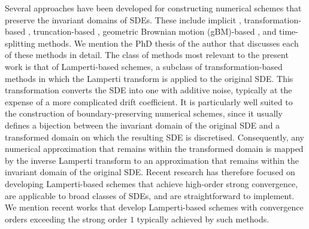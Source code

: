 \documentclass[11pt]{amsart}
\begin{document}
{Several approaches have been developed for constructing numerical schemes that preserve the invariant domains of SDEs. These include implicit \cite{MR2931351,MR4850627,MR1410392}, transformation-based \cite{MR3006996,MR4220738,MR2898556,MR3248050,MR4274899}, truncation-based \cite{MR2367990,MR4242953}, geometric Brownian motion (gBM)-based \cite{MR4177372,MR4780408,MR4729657,DomPres}, and time-splitting \cite{MR4780408,MR4544037,MR2341800} methods. We mention the PhD thesis of the author \cite{MR5051815} that discusses each of these methods in detail. The class of methods most relevant to the present work is that of Lamperti-based schemes, a subclass of transformation-based methods in which the Lamperti transform is applied to the original SDE. This transformation converts the SDE into one with additive noise, typically at the expense of a more complicated drift coefficient. It is particularly well suited to the construction of boundary-preserving numerical schemes, since it usually defines a bijection between the invariant domain of the original SDE and a transformed domain on which the resulting SDE is discretised. Consequently, any numerical approximation that remains within the transformed domain is mapped by the inverse Lamperti transform to an approximation that remains within the invariant domain of the original SDE. Recent research has therefore focused on developing Lamperti-based schemes that achieve high-order strong convergence, are applicable to broad classes of SDEs, and are straightforward to implement. We mention recent works \cite{MR4888024,MR4597411} that develop Lamperti-based schemes with convergence orders exceeding the strong order $1$ typically achieved by such methods.

}
\end{document}
